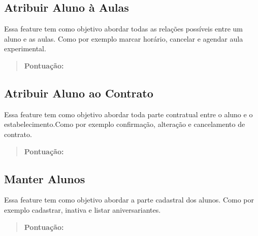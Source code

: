 \subsection[Atribuir Aluno à Aulas]{Atribuir Aluno à Aulas}
Essa feature tem como objetivo abordar todas as relações possíveis entre
um aluno e as aulas. Como por exemplo marcar horário, cancelar e agendar aula
experimental.
\begin{quote}
    \textbf{Pontuação:}
\end{quote}

\subsection[Atribuir Aluno ao Contrato]{Atribuir Aluno ao Contrato}
Essa feature tem como objetivo abordar toda parte contratual entre o aluno e o
estabelecimento.Como por exemplo confirmação, alteração e cancelamento de
contrato.
\begin{quote}
    \textbf{Pontuação:}
\end{quote}

\subsection[Manter Alunos]{Manter Alunos}
Essa feature tem como objetivo abordar a parte cadastral dos alunos. Como por
exemplo cadastrar, inativa e listar aniversariantes.
\begin{quote}
    \textbf{Pontuação:}
\end{quote}
